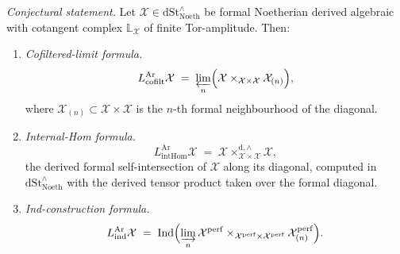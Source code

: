 \begin{proposition}
\label{v4-arith:bzn-rcompletion:prop:R3-three-computations}
\emph{Conjectural statement.} Let \(\mathcal{X}\in\mathrm{dSt}^{\wedge}_{\mathrm{Noeth}}\)
be formal Noetherian derived algebraic with cotangent complex
\(\mathbb{L}_{\mathcal{X}}\) of finite Tor-amplitude. Then:
\begin{enumerate}
\item \emph{Cofiltered-limit formula.}
\begin{equation}
L^{\mathrm{Ar}}_{\mathrm{cofilt}}\mathcal{X}
\;=\;\varprojlim_{n}\Bigl(\mathcal{X}\times_{\mathcal{X}\times\mathcal{X}}\mathcal{X}_{(n)}\Bigr),
\end{equation}
where \(\mathcal{X}_{(n)}\subset\mathcal{X}\times\mathcal{X}\) is the
\(n\)-th formal neighbourhood of the diagonal.
\item \emph{Internal-Hom formula.}
\begin{equation}
L^{\mathrm{Ar}}_{\mathrm{intHom}}\mathcal{X}
\;=\;\mathcal{X}\times_{\mathcal{X}\times\mathcal{X}}^{\mathrm{d},\wedge}\mathcal{X},
\end{equation}
the derived formal self-intersection of \(\mathcal{X}\) along its
diagonal, computed in \(\mathrm{dSt}^{\wedge}_{\mathrm{Noeth}}\)
with the derived tensor product taken over the formal diagonal.
\item \emph{Ind-construction formula.}
\begin{equation}
L^{\mathrm{Ar}}_{\mathrm{ind}}\mathcal{X}
\;=\;\mathrm{Ind}\Bigl(\varinjlim_{n}\mathcal{X}^{\mathrm{perf}}\times_{\mathcal{X}^{\mathrm{perf}}\times\mathcal{X}^{\mathrm{perf}}}\mathcal{X}^{\mathrm{perf}}_{(n)}\Bigr).
\end{equation}
\end{enumerate}
\end{proposition}

